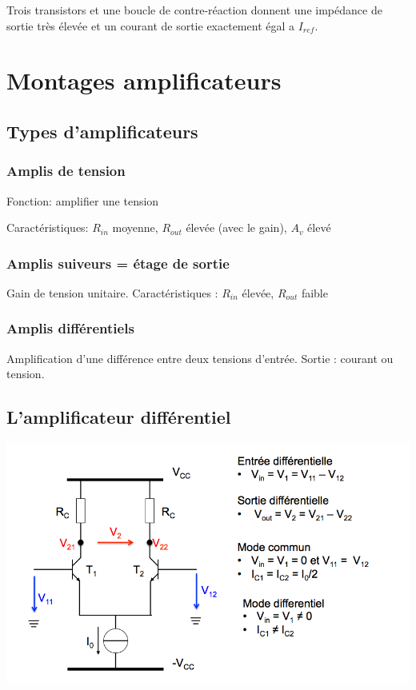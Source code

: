 \documentclass[]{article}
\begin{document}
Trois transistors et une boucle de contre-réaction donnent une impédance de sortie très élevée et un courant de sortie exactement égal a $I_{ref}$.

\section{Montages amplificateurs}
\subsection{Types d'amplificateurs}
\subsubsection{Amplis de tension}
Fonction: amplifier une tension

Caractéristiques: $R_{in}$ moyenne, $R_{out}$ élevée (avec le gain), $A_v$ élevé

\subsubsection{Amplis suiveurs = étage de sortie}
Gain de tension unitaire. Caractéristiques : $R_{in}$ élevée, $R_{out}$ faible
\subsubsection{Amplis différentiels}
Amplification d'une différence entre deux tensions d'entrée. Sortie : courant ou tension.

\subsection{L'amplificateur différentiel}
\includegraphics[scale=0.7]{amplidif}
\end{document}
